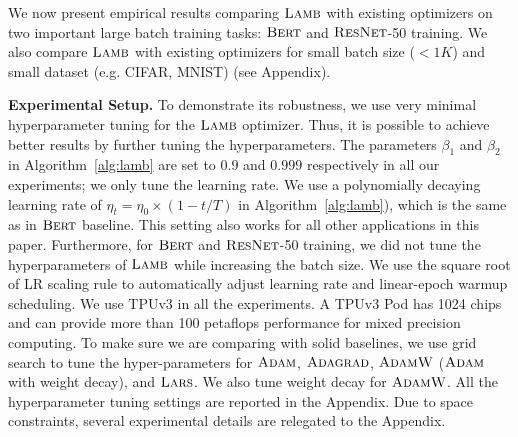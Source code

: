 We now present empirical results comparing $\textsc{Lamb}$ with existing optimizers on two important large batch training tasks: $\textsc{Bert}$ and $\textsc{ResNet}$-50 training. 
We also compare $\textsc{Lamb}$ with existing optimizers for small batch size ($<1K$) and small dataset (e.g. CIFAR, MNIST) (see Appendix).

{\bf Experimental Setup. } To demonstrate its robustness, we use very minimal hyperparameter tuning for the $\textsc{Lamb}$ optimizer. Thus, it is possible to achieve better results by further tuning the hyperparameters. The parameters $\beta_1 $ and $\beta_2$ in Algorithm~\ref{alg:lamb} are set to $0.9$ and $0.999$ respectively in all our experiments; we only tune the learning rate. We use a polynomially decaying learning rate of $\eta_t = \eta_0 \times (1 - t/T)$ in Algorithm~\ref{alg:lamb}), which is the same as in $\textsc{Bert}$ baseline. This setting also works for all other applications in this paper.
Furthermore, for $\textsc{Bert}$ and $\textsc{ResNet}$-50  training, we did not tune the hyperparameters of $\textsc{Lamb}$ while increasing the batch size. We use the square root of LR scaling rule to automatically adjust learning rate and linear-epoch warmup scheduling. %
We use TPUv3 in all the experiments.
A TPUv3 Pod has 1024 chips and can provide more than 100 petaflops performance for mixed precision computing.
To make sure we are comparing with solid baselines, we use grid search to tune the hyper-parameters for 
$\textsc{Adam}$, $\textsc{Adagrad}$, $\textsc{AdamW}$ ($\textsc{Adam}$ with weight decay), and $\textsc{Lars}$. We also tune weight decay for $\textsc{AdamW}$. All the hyperparameter tuning settings are reported in the Appendix. %
Due to space constraints, several experimental details are relegated to the Appendix.


